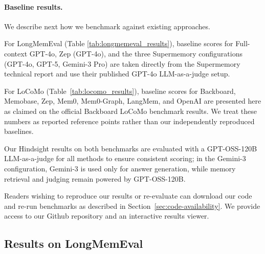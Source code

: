 \paragraph{Baseline results.} We describe next how we benchmark \our against existing approaches.

For LongMemEval (Table \ref{tab:longmemeval_results}), baseline scores for Full-context GPT-4o, Zep (GPT-4o), and the three Supermemory configurations (GPT-4o, GPT-5, Gemini-3 Pro) are taken directly from the Supermemory technical report and use their published GPT-4o LLM-as-a-judge setup. 

For LoCoMo (Table~\ref{tab:locomo_results}), baseline scores for Backboard, Memobase, Zep, Mem0, Mem0-Graph, LangMem, and OpenAI are presented here
as claimed on the official Backboard
LoCoMo benchmark results. We treat these numbers as reported reference points rather than
our independently reproduced baselines.

Our Hindsight results on both benchmarks are evaluated with a GPT-OSS-120B LLM-as-a-judge for all methods to ensure consistent scoring; in the Gemini-3 configuration, Gemini-3 is used only for answer generation, while memory retrieval and judging remain powered by GPT-OSS-120B.

Readers wishing to reproduce our results or re-evaluate \our can download our code and re-run benchmarks as described in
Section~\ref{sec:code-availability}. We provide access to our Github repository and an interactive results viewer.




\subsection{Results on LongMemEval}

